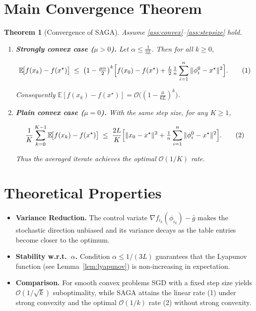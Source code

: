 \documentclass{article}
\newtheorem{theorem}{Theorem}
\newcommand{\E}{\mathbb{E}}
\begin{document}
\section*{Main Convergence Theorem}
\begin{theorem}[Convergence of SAGA]\label{thm:convergence}
Assume \ref{ass:convex}--\ref{ass:stepsize} hold.
\begin{enumerate}[label=(\alph*)]
\item \textbf{Strongly convex case (\(\mu>0\)).}
Let \(\alpha\le \frac{1}{3L}\). Then for all \(k\ge 0\),

\[
\E\!\bigl[f(x_k)-f(x^{\star})\bigr]
\;\le\;
\bigl(1-\tfrac{\mu\alpha}{2}\bigr)^{k}
\Bigl[f(x_0)-f(x^{\star})+\tfrac{L}{2}\tfrac{1}{n}\sum_{i=1}^{n}\|\phi_i^{0}-x^{\star}\|^{2}\Bigr].
\tag{1}
\]

Consequently \(\E[f(x_k)-f(x^{\star})]=\mathcal{O}\!\bigl((1-\frac{\mu}{6L})^{k}\bigr)\).

\item \textbf{Plain convex case (\(\mu=0\)).}
With the same step size, for any \(K\ge 1\),

\[
\frac{1}{K}\sum_{k=0}^{K-1}\E\!\bigl[f(x_k)-f(x^{\star})\bigr]
\;\le\;
\frac{2L}{K}\Bigl[\|x_0-x^{\star}\|^{2}
      +\tfrac{1}{n}\sum_{i=1}^{n}\|\phi_i^{0}-x^{\star}\|^{2}\Bigr].
\tag{2}
\]

Thus the averaged iterate achieves the optimal \(\mathcal{O}(1/K)\) rate.
\end{enumerate}
\end{theorem}

\section*{Theoretical Properties}
\begin{itemize}
\item \textbf{Variance Reduction.} The control variate
\(\nabla f_{i_k}(\phi_{i_k})-\bar g\) makes the stochastic direction unbiased
and its variance decays as the table entries become closer to the optimum.
\item \textbf{Stability w.r.t.\ \(\alpha\).} Condition \(\alpha\le 1/(3L)\) guarantees that the
Lyapunov function (see Lemma~\ref{lem:lyapunov}) is non‑increasing in expectation.
\item \textbf{Comparison.}
For smooth convex problems SGD with a fixed step size yields
\(\mathcal{O}(1/\sqrt{k})\) suboptimality, while SAGA attains the linear
rate (1) under strong convexity and the optimal \(\mathcal{O}(1/k)\) rate (2) without strong convexity.
\end{itemize}
\end{document}
